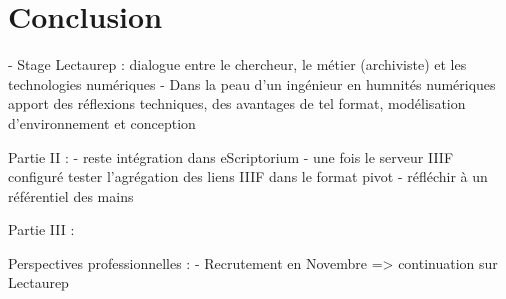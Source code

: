 \part*{Conclusion}

- Stage Lectaurep : dialogue entre le chercheur, le métier (archiviste) et les technologies numériques 
- Dans la peau d'un ingénieur en humnités numériques apport des réflexions techniques, des avantages de tel format, modélisation d'environnement et conception 

Partie II : 
- reste intégration dans eScriptorium 
- une fois le serveur IIIF configuré tester l'agrégation des liens IIIF dans le format pivot
- réfléchir à un référentiel des mains

Partie III : 


Perspectives professionnelles : 
- Recrutement en Novembre => continuation sur Lectaurep 